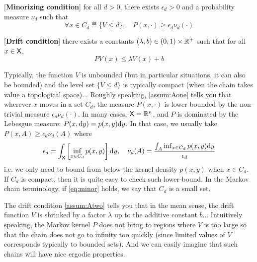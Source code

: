 \documentclass[english,graybox,envcountchap,envcountsame,sectrefs,shortlabels]{svmono}
\theoremstyle{style}
\newenvironment{hyp}[1]{
\begin{enumerate}[label=(\textbf{\sf #1}\arabic*),resume=hyp#1]\begin{sf}}
{\end{sf}\end{enumerate}}
\begin{document}
\begin{hyp}{A}
\item\label{assum:Aone} [{\bf Minorizing condition}] for all $d>0$, there exists $\epsilon_d>0$ and a probability measure $\nu_d$ such that 
\begin{equation}
\label{eq:minor}
\forall x\in C_d\eqdef\{V\leq d\}, \quad
P(x,\cdot) \geq \epsilon_d \nu_d(\cdot)
\end{equation}
\end{hyp}


\begin{hyp}{A}
\item\label{assum:Atwo} [{\bf Drift condition}] there exists a constants $(\lambda,b)\in (0,1) \times \mathbb{R}^+$ such that for all $x\in\mathsf{X}$,
$$
PV(x) \leq \lambda V(x)+b
$$
\end{hyp}

Typically, the function $V$ is unbounded (but in particular situations, it can also be bounded) and the level set $\{V\leq d\}$ is typically compact (when the chain takes value a topological space)... Roughly speaking, \ref{assum:Aone} tells you that wherever $x$ moves in a set $C_d$, the measure $P(x,\cdot)$ is lower bounded by the non-trivial measure $\epsilon_d \nu_d(\cdot)$. In many cases, $\mathsf{X}=\mathbb{R}^n$, and $P$ is dominated by the Lebesgue measure: $P(x,\mathrm{d} y)=p(x,y)\mathrm{d} y$. In that case, we usually take $P(x,A)\geq \epsilon_d  \nu_d(A)$ where
$$
 \epsilon_d=\int_{\mathsf{X}} \left[\inf_{x\in C_d}p(x,y)\right]\mathrm{d} y, \quad \nu_d(A)=\frac{\int_A \inf_{x\in C_d}p(x,y)\mathrm{d} y}{\epsilon_d}
$$
i.e. we only need to bound from below the kernel density $p(x,y)$ when $x\in C_d$. If $C_d$ is compact, then it is quite easy to check such lower-bound. In the Markov chain terminology, if   \eqref{eq:minor} holds, we say that $C_d$ is a small set. 

The drift condition \ref{assum:Atwo} tells you that in the mean sense, the drift function $V$ is shrinked by a factor $\lambda$ up to the additive constant $b$... Intuitively speaking, the Markov kernel $P$ does not bring to regions where $V$ is too large so that the chain does not go to infinity too quickly (since limited values of $V$ corresponds typically to bounded sets). And we can easily  imagine that such chains will have nice ergodic properties.
\end{document}
